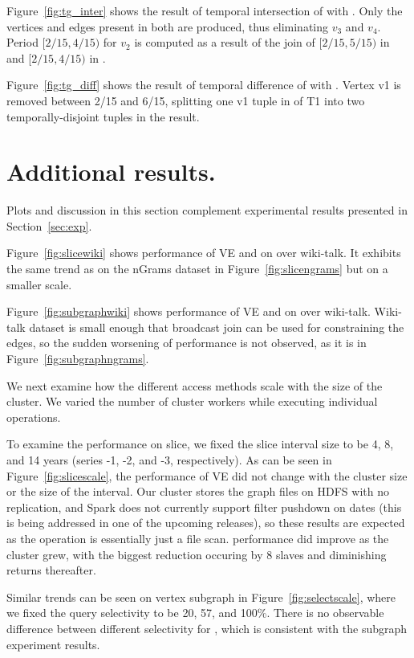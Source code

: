 Figure~\ref{fig:tg_inter} shows the result of temporal intersection
of  with .  Only the vertices and edges present in
both \tgs are produced, thus eliminating $v_3$ and $v_4$.  Period
$[2/15, 4/15)$ for $v_2$ is computed as a result of the join of
$[2/15, 5/15)$ in  and [$2/15, 4/15)$ in .

Figure~\ref{fig:tg_diff} shows the result of temporal difference
of  with .  Vertex v1 is removed between 2/15 and
6/15, splitting one v1 tuple in \tv of T1 into two temporally-disjoint
tuples in the result.

\section{Additional results.}
\label{sec:app2}

Plots and discussion in this section complement experimental results
presented in Section~\ref{sec:exp}.

Figure~\ref{fig:slicewiki} shows performance of VE and \sg
on  over wiki-talk.  It exhibits the same trend as on the
nGrams dataset in Figure~\ref{fig:slicengrams} but on a smaller scale.

Figure~\ref{fig:subgraphwiki} shows performance of VE and \sg
on  over wiki-talk.  Wiki-talk dataset is small
enough that broadcast join can be used for constraining the edges, so
the sudden worsening of performance is not observed, as it is in
Figure~\ref{fig:subgraphngrams}.

We next examine how the different access methods scale with the size
of the cluster.  We varied the number of cluster workers while
executing individual operations.

To examine the performance on slice, we fixed the slice interval size
to be 4, 8, and 14 years (series -1, -2, and -3, respectively).  As
can be seen in Figure~\ref{fig:slicescale}, the performance of VE did
not change with the cluster size or the size of the interval.  Our
cluster stores the graph files on HDFS with no replication, and Spark
does not currently support filter pushdown on dates (this is being
addressed in one of the upcoming releases), so these results are
expected as the operation is essentially just a file scan.  \rg
performance did improve as the cluster grew, with the biggest
reduction occuring by 8 slaves and diminishing returns thereafter. 

Similar trends can be seen on vertex subgraph in
Figure~\ref{fig:selectscale}, where we fixed the query selectivity to
be 20, 57, and 100\%.  There is no observable difference between
different selectivity for \rg, which is consistent with the subgraph
experiment results.

